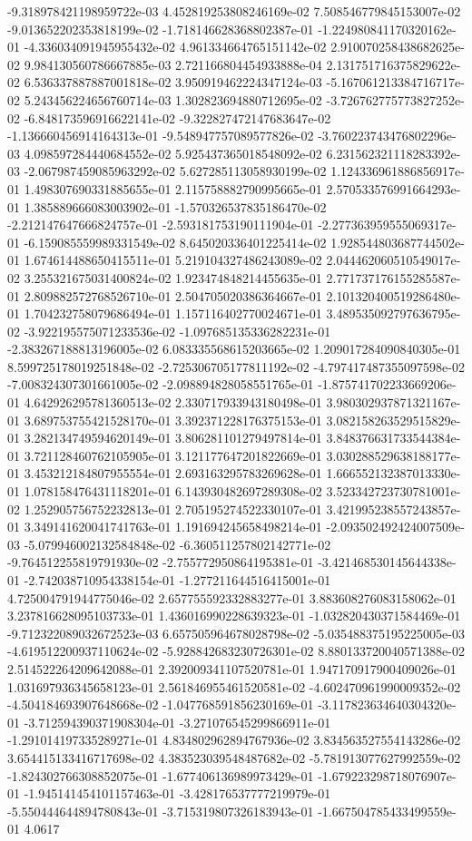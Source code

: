 -9.318978421198959722e-03	4.452819253808246169e-02	7.508546779845153007e-02	-9.013652202353818199e-02	-1.718146628368802387e-01	-1.224980841170320162e-01	-4.336034091945955432e-02	4.961334664765151142e-02	2.910070258438682625e-02	9.984130560786667885e-03	2.721166804454933888e-04	2.131751716375829622e-02	6.536337887887001818e-02	3.950919462224347124e-03	-5.167061213384716717e-02	5.243456224656760714e-03	1.302823694880712695e-02	-3.726762775773827252e-02	-6.848173596916622141e-02	-9.322827472147683647e-02	-1.136660456914164313e-01	-9.548947757089577826e-02	-3.760223743476802296e-03	4.098597284440684552e-02	5.925437365018548092e-02	6.231562321118283392e-03	-2.067987459085963292e-02	5.627285113058930199e-02	1.124336961886856917e-01	1.498307690331885655e-01	2.115758882790995665e-01	2.570533576991664293e-01	1.385889666083003902e-01	-1.570326537835186470e-02	-2.212147647666824757e-01	-2.593181753190111904e-01	-2.277363959555069317e-01	-6.159085559989331549e-02	8.645020336401225414e-02	1.928544803687744502e-01	1.674614488650415511e-01	5.219104327486243089e-02	2.044462060510549017e-02	3.255321675031400824e-02	1.923474848214455635e-01	2.771737176155285587e-01	2.809882572768526710e-01	2.504705020386364667e-01	2.101320400519286480e-01	1.704232758079686494e-01	1.157116402770024671e-01	3.489535092797636795e-02	-3.922195575071233536e-02	-1.097685135336282231e-01	-2.383267188813196005e-02	6.083335568615203665e-02	1.209017284090840305e-01	8.599725178019251848e-02	-2.725306705177811192e-02	-4.797417487355097598e-02	-7.008324307301661005e-02	-2.098894828058551765e-01	-1.875741702233669206e-01	4.642926295781360513e-02	2.330717933943180498e-01	3.980302937871321167e-01	3.689753755421528170e-01	3.392371228176375153e-01	3.082158263529515829e-01	3.282134749594620149e-01	3.806281101279497814e-01	3.848376631733544384e-01	3.721128460762105905e-01	3.121177647201822669e-01	3.030288529638188177e-01	3.453212184807955554e-01	2.693163295783269628e-01	1.666552132387013330e-01	1.078158476431118201e-01	6.143930482697289308e-02	3.523342723730781001e-02	1.252905756752232813e-01	2.705195274522330107e-01	3.421995238557243857e-01	3.349141620041741763e-01	1.191694245658498214e-01	-2.093502492424007509e-03	-5.079946002132584848e-02	-6.360511257802142771e-02	-9.764512255819791930e-02	-2.755772950864195381e-01	-3.421468530145644338e-01	-2.742038710954338154e-01	-1.277211644516415001e-01	4.725004791944775046e-02	2.657755592332883277e-01	3.883608276083158062e-01	3.237816628095103733e-01	1.436016990228639323e-01	-1.032820430371584469e-01	-9.712322089032672523e-03	6.657505964678028798e-02	-5.035488375195225005e-03	-4.619512200937110624e-02	-5.928842683230726301e-02	8.880133720040571388e-02	2.514522264209642088e-01	2.392009341107520781e-01	1.947170917900409026e-01	1.031697936345658123e-01	2.561846955461520581e-02	-4.602470961990009352e-02	-4.504184693907648668e-02	-1.047768591856230169e-01	-3.117823634640304320e-01	-3.712594390371908304e-01	-3.271076545299866911e-01	-1.291014197335289271e-01	4.834802962894767936e-02	3.834563527554143286e-02	3.654415133416717698e-02	4.383523039548487682e-02	-5.781913077627992559e-02	-1.824302766308852075e-01	-1.677406136989973429e-01	-1.679223298718076907e-01	-1.945141454101157463e-01	-3.428176537777219979e-01	-5.550444644894780843e-01	-3.715319807326183943e-01	-1.667504785433499559e-01	4.0617